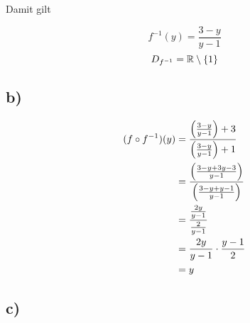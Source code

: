 \documentclass[a4paper, 11pt]{article}
\begin{document}
Damit gilt

$$ f^{-1}(y) = \frac{3-y}{y-1} $$
$$ D_{f^{-1}} = \mathbb{R} \setminus \{1\} $$

\subsection{b)}
\label{sec:orga3f8882}
\begin{align*}
    (f \circ f^{-1})(y) &= \frac{\left(\frac{3-y}{y-1}\right)+3}{\left(\frac{3-y}{y-1}\right)+1} \\
    &= \frac{\left(\frac{3-y + 3y-3}{y-1}\right)}{\left(\frac{3-y + y-1}{y-1}\right)} \\
    &= \frac{\frac{2y}{y-1}}{\frac{2}{y-1}} \\
    &= \frac{2y}{y-1} \cdot \frac{y-1}{2} \\
    &= y \\
\end{align*}

\subsection{c)}
\label{sec:org9a3aa74}
\end{document}
